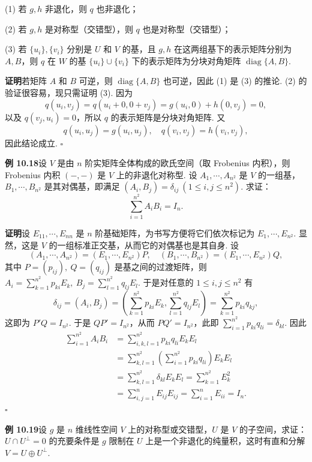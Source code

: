 \documentclass[UTF8, 12pt, fontset=fandol, oneside]{ctexart}
\begin{document}
(1) 若 $g,h$ 非退化，则 $q$ 也非退化；

(2) 若 $g,h$ 是对称型（交错型），则 $q$ 也是对称型（交错型）；

(3) 若 $\{u_i\},\{v_i\}$ 分别是 $U$ 和 $V$ 的基，且 $g,h$ 在这两组基下的表示矩阵分别为 $A,B$，则 $q$ 在 $W$ 的基 $\{u_i\}\cup\{v_i\}$ 下的表示矩阵为分块对角矩阵 $\operatorname{diag}\{A,B\}$.

\noindent\textbf{证明}\quad 若矩阵 $A$ 和 $B$ 可逆，则 $\operatorname{diag}\{A,B\}$ 也可逆，因此 (1) 是 (3) 的推论. (2) 的验证很容易，现只需证明 (3). 因为
\[
q(u_i,v_j)=q(u_i+0,0+v_j)=g(u_i,0)+h(0,v_j)=0,
\]
以及 $q(v_j,u_i)=0$，所以 $q$ 的表示矩阵是分块对角矩阵. 又
\[
q(u_i,u_j)=g(u_i,u_j),\quad q(v_i,v_j)=h(v_i,v_j),
\]
因此结论成立. $\square$

\noindent\textbf{例 10.18}\quad 设 $V$ 是由 $n$ 阶实矩阵全体构成的欧氏空间（取 Frobenius 内积），则 Frobenius 内积 $(-,-)$ 是 $V$ 上的非退化对称型. 设 $A_1,\cdots,A_{n^2}$ 是 $V$ 的一组基，$B_1,\cdots,B_{n^2}$ 是其对偶基，即满足 $(A_i,B_j)=\delta_{ij}\ (1\le i,j\le n^2)$. 求证：
\[
\sum_{i=1}^{n^2}A_iB_i=I_n.
\]

\noindent\textbf{证明}\quad 设 $E_{11},\cdots,E_{nn}$ 是 $n$ 阶基础矩阵，为书写方便将它们依次标记为 $E_1,\cdots,E_{n^2}$. 显然，这是 $V$ 的一组标准正交基，从而它的对偶基也是其自身. 设
\[
(A_1,\cdots,A_{n^2})=(E_1,\cdots,E_{n^2})P,\quad
(B_1,\cdots,B_{n^2})=(E_1,\cdots,E_{n^2})Q,
\]
其中 $P=(p_{ij}),\ Q=(q_{ij})$ 是基之间的过渡矩阵，则 $A_i=\sum_{k=1}^{n^2}p_{ki}E_k,\ B_j=\sum_{l=1}^{n^2}q_{lj}E_l$. 于是对任意的 $1\le i,j\le n^2$ 有
\[
\delta_{ij}=(A_i,B_j)=\left(\sum_{k=1}^{n^2}p_{ki}E_k,\sum_{l=1}^{n^2}q_{lj}E_l\right)=\sum_{k=1}^{n^2}p_{ki}q_{kj},
\]
这即为 $P'Q=I_{n^2}$. 于是 $QP'=I_{n^2}$，从而 $PQ'=I_{n^2}$，此即 $\sum_{i=1}^{n^2}p_{ki}q_{li}=\delta_{kl}$. 因此
\[
\begin{aligned}
\sum_{i=1}^{n^2}A_iB_i
&=\sum_{i,k,l=1}^{n^2}p_{ki}q_{li}E_kE_l\\
&=\sum_{k,l=1}^{n^2}\left(\sum_{i=1}^{n^2}p_{ki}q_{li}\right)E_kE_l\\
&=\sum_{k,l=1}^{n^2}\delta_{kl}E_kE_l
=\sum_{k=1}^{n^2}E_k^2\\
&=\sum_{i,j=1}^n E_{ij}E_{ij}
=\sum_{i=1}^n E_{ii}=I_n.
\end{aligned}
\]
$\square$

\noindent\textbf{例 10.19}\quad 设 $g$ 是 $n$ 维线性空间 $V$ 上的对称型或交错型，$U$ 是 $V$ 的子空间，求证：$U\cap U^\perp=0$ 的充要条件是 $g$ 限制在 $U$ 上是一个非退化的纯量积，这时有直和分解 $V=U\oplus U^\perp$.
\end{document}
